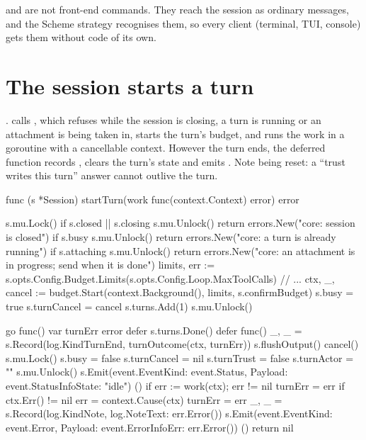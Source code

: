 and  are not front-end commands. They
reach the session as ordinary messages, and the Scheme strategy recognises
them, so every client (terminal, TUI, console) gets them without code of
its own.

\section{The session starts a turn}

.  calls , which
refuses while the session is closing, a turn is running or an attachment
is being taken in, starts the
turn's budget, and runs the work in a goroutine with a cancellable context.
However the turn ends, the deferred function records ,
clears the turn's state and emits . Note 
being reset: a ``trust writes this turn'' answer cannot outlive the turn.

\begin{go}
func (s *Session) startTurn(work func(context.Context) error) error {
    s.mu.Lock()
    if s.closed || s.closing {
        s.mu.Unlock()
        return errors.New("core: session is closed")
    }
    if s.busy {
        s.mu.Unlock()
        return errors.New("core: a turn is already running")
    }
    if s.attaching {
        s.mu.Unlock()
        return errors.New("core: an attachment is in progress; send when it is done")
    }
    limits, err := s.opts.Config.Budget.Limits(s.opts.Config.Loop.MaxToolCalls)
    // ...
    ctx, _, cancel := budget.Start(context.Background(), limits, s.confirmBudget)
    s.busy = true
    s.turnCancel = cancel
    s.turns.Add(1)
    s.mu.Unlock()

    go func() {
        var turnErr error
        defer s.turns.Done()
        defer func() {
            _, _ = s.Record(log.KindTurnEnd, turnOutcome(ctx, turnErr))
            s.flushOutput()
            cancel()
            s.mu.Lock()
            s.busy = false
            s.turnCancel = nil
            s.turnTrust = false
            s.turnActor = ""
            s.mu.Unlock()
            s.Emit(event.Event{Kind: event.Status, Payload: event.StatusInfo{State: "idle"}})
        }()
        if err := work(ctx); err != nil {
            turnErr = err
            if ctx.Err() != nil {
                err = context.Cause(ctx)
                turnErr = err
                _, _ = s.Record(log.KindNote, log.Note{Text: err.Error()})
            }
            s.Emit(event.Event{Kind: event.Error, Payload: event.ErrorInfo{Err: err.Error()}})
        }
    }()
    return nil
}
\end{go}

